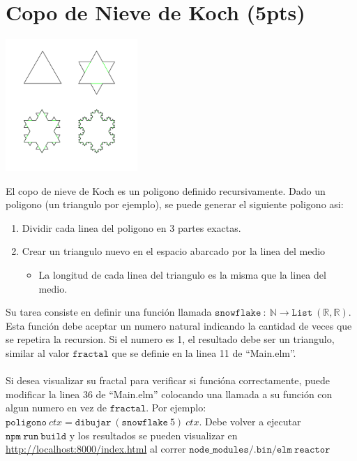 \documentclass{article}
\begin{document}
\section*{Copo de Nieve de Koch (5pts)}
\begin{center}
        \includegraphics[width=5cm]{include/snowflake.png}
\end{center}
El copo de nieve de Koch es un poligono definido recursivamente.
Dado un poligono (un triangulo por ejemplo), se puede generar el
siguiente poligono asi:
\begin{enumerate}
        \item{Dividir cada linea del poligono en 3 partes exactas.}
        \item{Crear un triangulo nuevo en el espacio abarcado por la linea del medio
        \begin{itemize}
                \item{La longitud de cada linea del triangulo es la misma que la
                linea del medio.}
        \end{itemize}
        }
\end{enumerate}
Su tarea consiste en definir una funci\'on llamada $\mathtt{snowflake}\ :\ \mathbb{N}\rightarrow
\mathtt{List}\ (\mathbb{R},\mathbb{R})$. Esta funci\'on debe aceptar un numero natural indicando
la cantidad de veces que se repetira la recursion. Si el numero es 1, el resultado debe ser
un triangulo, similar al valor $\mathtt{fractal}$ que se definie en la linea 11 de ``Main.elm''.
\\\\
Si desea visualizar su fractal para verificar si funci\'ona correctamente, puede modificar la linea
36 de ``Main.elm'' colocando una llamada a su funci\'on con algun numero en vez de $\mathtt{fractal}$.
Por ejemplo: $\mathtt{poligono}\ ctx=\mathtt{dibujar}\ (\mathtt{snowflake}\ 5)\ ctx$. Debe volver a ejecutar $\mathtt{npm\ run\ build}$
y los resultados se pueden visualizar en \url{http://localhost:8000/index.html} al correr
$\mathtt{node\_modules/.bin/elm\ reactor}$
\end{document}
